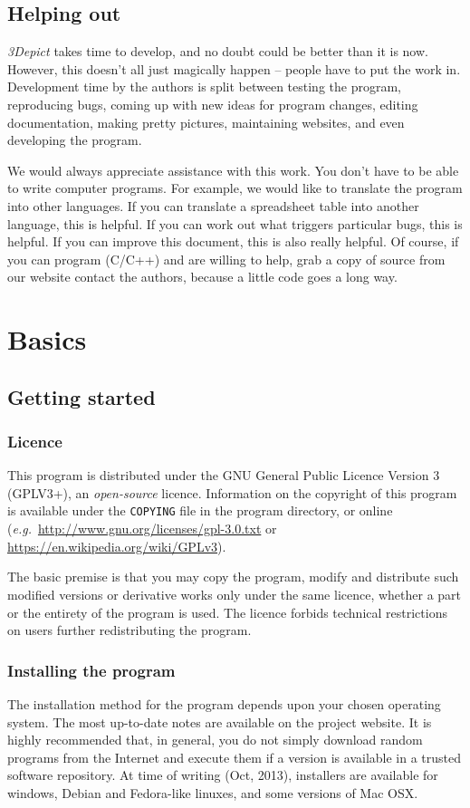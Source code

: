 \documentclass[10pt]{article}
\begin{document}
\subsection{Helping out}

\emph{3Depict} takes time to develop, and no doubt could be better than it is now. However, this doesn't all just magically happen -- people have to put the work in. Development time by the authors is split between testing the program, reproducing bugs, coming up with new ideas for program changes, editing documentation, making pretty pictures, maintaining websites, and even developing the program. 

We would always appreciate assistance with this work. You don't have to be able to write computer programs. For example, we would like to translate the program into other languages. If you can translate a spreadsheet table into another language, this is helpful. If you can work out what triggers particular bugs, this is  helpful. If you can improve this document, this is also really helpful. Of course, if you can program (C/C++) and are willing to help, grab a copy of source from our website contact the authors, because a little code goes a long way.

\section{Basics}
\subsection{Getting started}
\subsubsection{Licence}
\label{sec:licence} 
This program is distributed under the GNU General Public Licence Version 3 (GPLV3+), an \textit{open-source} licence. Information on the copyright of this program is available under the \texttt{COPYING} file in the program directory, or online (\emph{e.g.}\ \url{http://www.gnu.org/licenses/gpl-3.0.txt} or \url{https://en.wikipedia.org/wiki/GPLv3}).

The basic premise is that you may copy the program, modify and distribute such modified versions or derivative works only under the same licence, whether a part or the entirety of the program is used. The licence forbids technical restrictions on users further redistributing the program.
 
\subsubsection{Installing the program}
The installation method for the program depends upon your chosen operating system. The most up-to-date notes are available on the project website. It is highly recommended that, in general, you do not simply download random programs from the Internet and execute them if a version is available in a trusted software repository.  At time of writing (Oct, 2013), installers are available for windows, Debian and Fedora-like linuxes, and some versions of Mac OSX.
\end{document}
